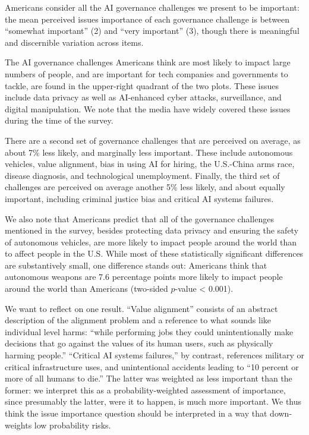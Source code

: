 \documentclass{article}
\begin{document}
Americans consider all the AI governance challenges we present to be important: the mean perceived issues importance of each governance challenge is between ``somewhat important'' (2) and ``very important'' (3), though there is meaningful and discernible variation across items.

The AI governance challenges Americans think are most likely to impact large numbers of people, and are important for tech companies and governments to tackle, are found in the upper-right quadrant of the two plots. These issues include data privacy as well as AI-enhanced cyber attacks, surveillance, and digital manipulation. We note that the media have widely covered these issues during the time of the survey.

There are a second set of governance challenges that are perceived on average, as about 7\% less likely, and marginally less important. These include autonomous vehicles, value alignment, bias in using AI for hiring, the U.S.-China arms race, disease diagnosis, and technological unemployment. Finally, the third set of challenges are perceived on average another 5\% less likely, and about equally important, including criminal justice bias and critical AI systems failures.

We also note that Americans predict that all of the governance challenges mentioned in the survey, besides protecting data privacy and ensuring the safety of autonomous vehicles, are more likely to impact people around the world than to affect people in the U.S. While most of these statistically significant differences are substantively small, one difference stands out: Americans think that autonomous weapons are 7.6 percentage points more likely to impact people around the world than Americans (two-sided \(p\)-value \textless{} 0.001).

We want to reflect on one result. ``Value alignment'' consists of an abstract description of the alignment problem and a reference to what sounds like individual level harms: ``while performing jobs they could unintentionally make decisions that go against the values of its human users, such as physically harming people.'' ``Critical AI systems failures,'' by contrast, references military or critical infrastructure uses, and unintentional accidents leading to ``10 percent or more of all humans to die.'' The latter was weighted as less important than the former: we interpret this as a probability-weighted assessment of importance, since presumably the latter, were it to happen, is much more important. We thus think the issue importance question should be interpreted in a way that down-weights low probability risks. 
\end{document}
